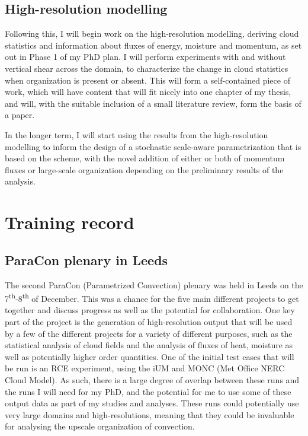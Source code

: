\documentclass[11pt,a4paper]{article}
\newcommand{\ts}{\textsuperscript}
\begin{document}
\subsection{High-resolution modelling}
\label{sec:high_res_modelling}
Following this, I will begin work on the high-resolution modelling, deriving cloud statistics and information about fluxes of energy, moisture and momentum, as set out in Phase 1 of my PhD plan. I will perform experiments with and without vertical shear across the domain, to characterize the change in cloud statistics when organization is present or absent. This will form a self-contained piece of work, which will have content that will fit nicely into one chapter of my thesis, and will, with the suitable inclusion of a small literature review, form the basis of a paper.

In the longer term, I will start using the results from the high-resolution modelling to inform the design of a stochastic scale-aware parametrization that is based on the \cite{plant2008stochastic} scheme, with the novel addition of either or both of momentum fluxes or large-scale organization depending on the preliminary results of the analysis.

\section{Training record}

\subsection{ParaCon plenary in Leeds}
The second ParaCon (Parametrized Convection) plenary was held in Leeds on the 7\ts{th}-8\ts{th} of December. This was a chance for the five main different projects to get together and discuss progress as well as the potential for collaboration. One key part of the project is the generation of high-resolution output that will be used by a few of the different projects for a variety of different purposes, such as the statistical analysis of cloud fields and the analysis of fluxes of heat, moisture as well as potentially higher order quantities. One of the initial test cases that will be run is an RCE experiment, using the iUM and MONC (Met Office NERC Cloud Model). As such, there is a large degree of overlap between these runs and the runs I will need for my PhD, and the potential for me to use some of these output data as part of my studies and analyses. These runs could potentially use very large domains and high-resolutions, meaning that they could be invaluable for analysing the upscale organization of convection.
\end{document}
